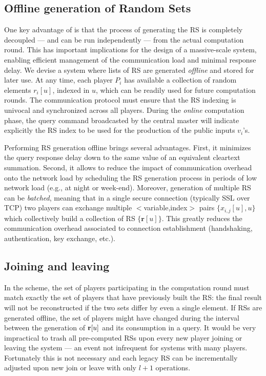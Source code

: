 \documentclass{sig-alternate}
\begin{document}
\subsection{Offline generation of Random Sets} 
One key advantage of \ata is that the process of generating the RS is completely decoupled --- and can be run independently --- from the actual computation round.
 This  has important implications for the design of a massive-scale system, enabling efficient management of  the communication load and minimal response delay. 
We devise  a system where lists of RS are generated {\em offline} and stored for later use. 
At any time, each player $P_i$ has available a collection of random elements $r_i[u]$, indexed in $u$, which can be readily used for future computation rounds. 
The communication protocol must ensure that the RS indexing is univocal and synchronized across all players. 
During the {\em online} computation phase, the query command broadcasted by the central master will indicate explicitly the RS index to be used for the production of the public inputs $v_i$'s. 

Performing  RS generation offline brings several advantages. First, it minimizes the query response delay down to the same value of an equivalent cleartext summation.
Second, it allows to reduce the impact of communication overhead onto the network load by scheduling the RS generation process in periods of low network load (e.g., at night or week-end). Moreover, generation of multiple RS can be {\em batched}, meaning that in a single secure connection (typically SSL over TCP) two players can exchange multiple $<$variable,index$>$ pairs  $\{x_{i,j}[u], u \}$ which collectively build a collection of RS $\{\mathbf{r}[u]\}$. This greatly reduces the communication overhead associated to connection establishment (handshaking, authentication, key exchange, etc.).\\


\subsection{Joining and leaving}
In the \ata scheme, the set of players participating in the computation round must match exactly the set of players that have previously built the RS: the final result will not be reconstructed if the two sets differ by even a single element.
If RSs are generated offline,  the set of players might have changed during the interval between the generation of  ${\bf{r}}[u]$ and its consumption in a query.
It would be very impractical to trash all pre-computed RSs upon every new player joining or leaving the system --- an event not infrequent for systems with many players.
Fortunately this is not necessary and each legacy RS can be incrementally adjusted upon new join or leave with only $l+1$ operations.
\end{document}
